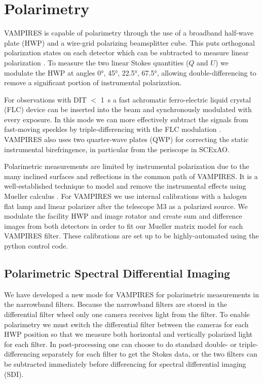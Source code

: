 \section{Polarimetry}\label{sec:polarimetry}

VAMPIRES is capable of polarimetry through the use of a broadband half-wave plate (HWP) and a wire-grid polarizing beamsplitter cube. This puts orthogonal polarization states on each detector which can be subtracted to measure linear polarization \citep{kuhn_imaging_2001}. To measure the two linear Stokes quantities ($Q$ and $U$) we modulate the HWP at angles \ang{0}, \ang{45}, \ang{22.5}, \ang{67.5}, allowing double-differencing to remove a significant portion of instrumental polarization.

For observations with DIT $<$ \SI{1}{\second} a fast achromatic ferro-electric liquid crystal (FLC) device can be inserted into the beam and synchronously modulated with every exposure. In this mode we can more effectively subtract the signals from fast-moving speckles by triple-differencing with the FLC modulation \citep{norris_vampires_2015}. VAMPIRES also uses two quarter-wave plates (QWP) for correcting the static instrumental birefringence, in particular from the periscope in SCExAO.

Polarimetric measurements are limited by instrumental polarization due to the many inclined surfaces and reflections in the common path of VAMPIRES. It is a well-established technique to model and remove the instrumental effects using Mueller calculus \citep{holstein_polarimetric_2020,joost_t_hart_full_2021}. For VAMPIRES we use internal calibrations with a halogen flat lamp and linear polarizer after the telescope M3 as a polarized source. We modulate the facility HWP and image rotator and create sum and difference images from both detectors in order to fit our Mueller matrix model for each VAMPIRES filter.  These calibrations are set up to be highly-automated using the python control code. 

\subsection{Polarimetric Spectral Differential Imaging}

We have developed a new mode for VAMPIRES for polarimetric measurements in the narrowband filters. Because the narrowband filters are stored in the differential filter wheel only one camera receives light from the filter. To enable polarimetry we must switch the differential filter between the cameras for each HWP position so that we measure both horizontal and vertically polarized light for each filter. In post-processing one can choose to do standard double- or triple-differencing separately for each filter to get the Stokes data, or the two filters can be subtracted immediately before differencing for spectral differential imaging (SDI).

